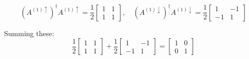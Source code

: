 \documentclass[12pt]{article}
\begin{document}
\[
\left(A^{(1) \uparrow}\right)^\dagger A^{(1) \uparrow} = \frac{1}{2}
\begin{bmatrix}
1 & 1 \\
1 & 1
\end{bmatrix}, \quad
\left(A^{(1) \downarrow}\right)^\dagger A^{(1) \downarrow} = \frac{1}{2}
\begin{bmatrix}
1 & -1 \\
-1 & 1
\end{bmatrix}
\]

Summing these:
\[
\frac{1}{2}
\begin{bmatrix}
1 & 1 \\
1 & 1
\end{bmatrix} + \frac{1}{2}
\begin{bmatrix}
1 & -1 \\
-1 & 1
\end{bmatrix} = 
\begin{bmatrix}
1 & 0 \\
0 & 1
\end{bmatrix}
\]
\end{document}
